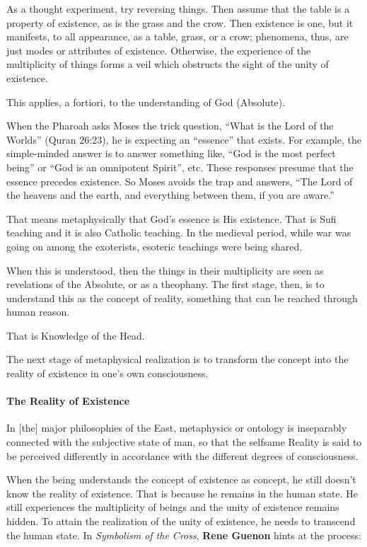 As a thought experiment, try reversing things. Then assume that the table is a property of existence, as is the grass and the crow. Then existence is one, but it manifests, to all appearance, as a table, grass, or a crow; phenomena, thus, are just modes or attributes of existence. Otherwise, the experience of the multiplicity of things forms a veil which obstructs the sight of the unity of existence.

This applies, a fortiori, to the understanding of God (Absolute). 

\begin{quotex}
When the Pharoah asks Moses the trick question, “What is the Lord of the Worlds” (Quran 26:23), he is expecting an “essence” that exists. For example, the simple-minded answer is to answer something like, “God is the most perfect being” or “God is an omnipotent Spirit”, etc. These responses presume that the essence precedes existence. So Moses avoids the trap and answers, “The Lord of the heavens and the earth, and everything between them, if you are aware.” 
\end{quotex}

That means metaphysically that God's essence is His existence. That is Sufi teaching and it is also Catholic teaching. In the medieval period, while war was going on among the exoterists, esoteric teachings were being shared.

When this is understood, then the things in their multiplicity are seen as revelations of the Absolute, or as a theophany. The first stage, then, is to understand this as the concept of reality, something that can be reached through human reason.

That is Knowledge of the Head.

The next stage of metaphysical realization is to transform the concept into the reality of existence in one's own consciousness.


\paragraph{The Reality of Existence}
\begin{quotex}
In [the] major philosophies of the East, metaphysics or ontology is inseparably connected with the subjective state of man, so that the selfsame Reality is said to be perceived differently in accordance with the different degrees of consciousness. 

\end{quotex}
When the being understands the concept of existence as concept, he still doesn't know the reality of existence. That is because he remains in the human state. He still experiences the multiplicity of beings and the unity of existence remains hidden. To attain the realization of the unity of existence, he needs to transcend the human state. In \emph{Symbolism of the Cross}, \textbf{Rene Guenon} hints at the process:

